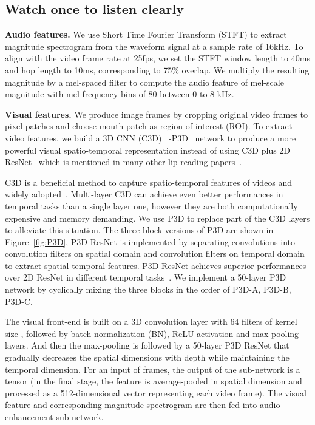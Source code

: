 \documentclass[10pt,twocolumn,letterpaper]{article}
\begin{document}
\subsection{Watch once to listen clearly}
{\bf Audio features.} We use Short Time Fourier Transform (STFT) to extract magnitude spectrogram from the waveform signal at a sample rate of 16kHz. To align with the video frame rate at 25fps, we set the STFT window length to 40ms and hop length to 10ms, corresponding to 75\% overlap. We multiply the resulting magnitude by a mel-spaced filter to compute the audio feature of mel-scale magnitude with mel-frequency bins of 80 between 0 to 8 kHz. 

{\bf Visual features.} We produce image frames by cropping original video frames to  pixel patches and choose mouth patch as region of interest (ROI). To extract video features, we build a 3D CNN (C3D)~\cite{tran2015learning} -P3D~\cite{qiu2017learning} network to produce a more powerful visual spatio-temporal representation instead of using C3D plus 2D ResNet~\cite{he2016deep} which is mentioned in many other lip-reading papers~\cite{Triantafyllos-avsr2018,afouras2018conversation,afouras2018deep,afouras2019my,chung2017lip,stafylakis2017combining}.

C3D is a beneficial method to capture spatio-temporal features of videos and widely adopted~\cite{stafylakis2017combining,Triantafyllos-avsr2018,afouras2018conversation,petridis2018end,afouras2019my}. Multi-layer C3D can achieve even better performances in temporal tasks than a single layer one, however they are both computationally expensive and memory demanding. We use P3D to replace part of the C3D layers to alleviate this situation. The three block versions of P3D are shown in Figure~\ref{fig:P3D}, P3D ResNet is implemented by separating  convolutions into  convolution filters on spatial domain and  convolution filters on temporal domain to extract spatial-temporal features. P3D ResNet achieves superior performances over 2D ResNet in different temporal tasks~\cite{qiu2017learning}. We implement a 50-layer P3D network by cyclically mixing the three blocks in the order of P3D-A, P3D-B, P3D-C.

The visual front-end is built on a 3D convolution layer with 64 filters of kernel size , followed by batch normalization (BN), ReLU activation and max-pooling layers. And then the max-pooling is followed by a 50-layer P3D ResNet that gradually decreases the spatial dimensions with depth while maintaining the temporal dimension. For an input of  frames, the output of the sub-network is a  tensor (in the final stage, the feature is average-pooled in spatial dimension and processed as a 512-dimensional vector representing each video frame). The visual feature and corresponding magnitude spectrogram are then fed into audio enhancement sub-network.
\end{document}
